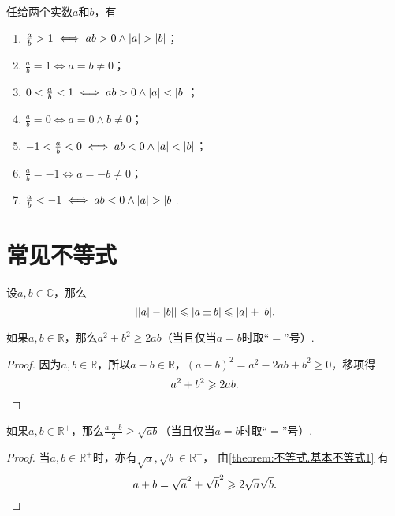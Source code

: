 \begin{theorem}[作商比较法]\label{theorem:不等式.作商比较法}
任给两个实数\(a\)和\(b\)，有\begin{enumerate}
\item \(\frac{a}{b} > 1 \iff ab > 0 \land \abs{a} > \abs{b}\)；
\item \(\frac{a}{b} = 1 \iff a = b \neq 0\)；
\item \(0 < \frac{a}{b} < 1 \iff ab > 0 \land \abs{a} < \abs{b}\)；
\item \(\frac{a}{b} = 0 \iff a = 0 \land b \neq 0\)；
\item \(-1 < \frac{a}{b} < 0 \iff ab < 0 \land \abs{a} < \abs{b}\)；
\item \(\frac{a}{b} = -1 \iff a = -b \neq 0\)；
\item \(\frac{a}{b} < -1 \iff ab < 0 \land \abs{a} > \abs{b}\).
\end{enumerate}
\end{theorem}

\section{常见不等式}
\begin{theorem}[三角不等式]\label{theorem:不等式.三角不等式}
设\(a,b\in\mathbb{C}\)，那么\begin{equation}
\abs{\abs{a}-\abs{b}} \leqslant \abs{a \pm b} \leqslant \abs{a} + \abs{b}.
\end{equation}
\end{theorem}

\begin{theorem}\label{theorem:不等式.基本不等式1}
如果\(a,b\in\mathbb{R}\)，那么\(a^2 + b^2 \geqslant 2ab\)（当且仅当\(a=b\)时取“\(=\)”号）.
\begin{proof}
因为\(a,b\in\mathbb{R}\)，所以\(a-b\in\mathbb{R}\)，\((a-b)^2 = a^2 - 2ab + b^2 \geqslant 0\)，移项得\[
a^2 + b^2 \geqslant 2ab.
\qedhere
\]
\end{proof}
\end{theorem}

\begin{corollary}\label{corollary:不等式.基本不等式2}
如果\(a,b\in\mathbb{R}^+\)，那么\(\frac{a+b}{2} \geqslant \sqrt{ab}\)（当且仅当\(a=b\)时取“\(=\)”号）.
\begin{proof}
当\(a,b\in\mathbb{R}^+\)时，亦有\(\sqrt{a},\sqrt{b}\in\mathbb{R}^+\)，%
由\cref{theorem:不等式.基本不等式1} 有\[
a + b = \sqrt{a}^2 + \sqrt{b}^2 \geqslant 2\sqrt{a}\sqrt{b}.
\qedhere
\]
\end{proof}
\end{corollary}

